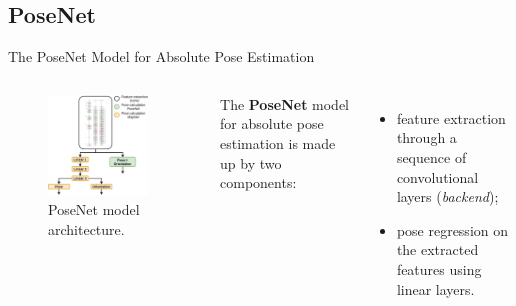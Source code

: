 \documentclass[
    center,
]{beamer}
\begin{document}
\subsection{PoseNet}
\begin{frame}{The PoseNet Model for Absolute Pose Estimation}
    \begin{columns}
        \begin{figure}
            \centering
            \includegraphics[width=0.9\textwidth]{../imgs/mapnet_posenet_structure.png}
            \caption{PoseNet model architecture.}
        \end{figure}

        The \textbf{PoseNet} model for absolute pose estimation is made up by two components:
        \begin{itemize}
            \item feature extraction through a sequence of convolutional layers (\emph{backend});
            \item pose regression on the extracted features using linear layers.
        \end{itemize}
    \end{columns}
\end{frame}
\end{document}
